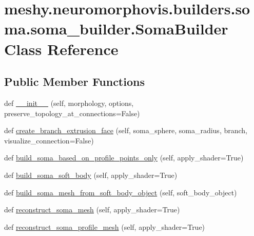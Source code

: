 \hypertarget{classmeshy_1_1neuromorphovis_1_1builders_1_1soma_1_1soma__builder_1_1SomaBuilder}{}\section{meshy.\+neuromorphovis.\+builders.\+soma.\+soma\+\_\+builder.\+Soma\+Builder Class Reference}
\label{classmeshy_1_1neuromorphovis_1_1builders_1_1soma_1_1soma__builder_1_1SomaBuilder}


 


\subsection*{Public Member Functions}
\begin{DoxyCompactItemize}
\item 
def \hyperlink{classmeshy_1_1neuromorphovis_1_1builders_1_1soma_1_1soma__builder_1_1SomaBuilder_aed3044dc0400eb41af60f12c5dbd9a02}{\+\_\+\+\_\+init\+\_\+\+\_\+} (self, morphology, options, preserve\+\_\+topology\+\_\+at\+\_\+connections=False)
\item 
def \hyperlink{classmeshy_1_1neuromorphovis_1_1builders_1_1soma_1_1soma__builder_1_1SomaBuilder_a32cd0ec9c6cc9df4a2c8cb5bd6fe0a5b}{create\+\_\+branch\+\_\+extrusion\+\_\+face} (self, soma\+\_\+sphere, soma\+\_\+radius, branch, visualize\+\_\+connection=False)
\item 
def \hyperlink{classmeshy_1_1neuromorphovis_1_1builders_1_1soma_1_1soma__builder_1_1SomaBuilder_ab6ed8d0bfb3c4f5d5e699907d7e110e4}{build\+\_\+soma\+\_\+based\+\_\+on\+\_\+profile\+\_\+points\+\_\+only} (self, apply\+\_\+shader=True)
\item 
def \hyperlink{classmeshy_1_1neuromorphovis_1_1builders_1_1soma_1_1soma__builder_1_1SomaBuilder_a8cc95d59ea4f712c628a186d3ee729fc}{build\+\_\+soma\+\_\+soft\+\_\+body} (self, apply\+\_\+shader=True)
\item 
def \hyperlink{classmeshy_1_1neuromorphovis_1_1builders_1_1soma_1_1soma__builder_1_1SomaBuilder_a82be619f4f6b762da648cfdbc7a1ca6d}{build\+\_\+soma\+\_\+mesh\+\_\+from\+\_\+soft\+\_\+body\+\_\+object} (self, soft\+\_\+body\+\_\+object)
\item 
def \hyperlink{classmeshy_1_1neuromorphovis_1_1builders_1_1soma_1_1soma__builder_1_1SomaBuilder_aad97d55539c922cca5577d9281121bf8}{reconstruct\+\_\+soma\+\_\+mesh} (self, apply\+\_\+shader=True)
\item 
def \hyperlink{classmeshy_1_1neuromorphovis_1_1builders_1_1soma_1_1soma__builder_1_1SomaBuilder_ab901b1001921b33d5782c43096e9d02b}{reconstruct\+\_\+soma\+\_\+profile\+\_\+mesh} (self, apply\+\_\+shader=True)
\end{DoxyCompactItemize}
